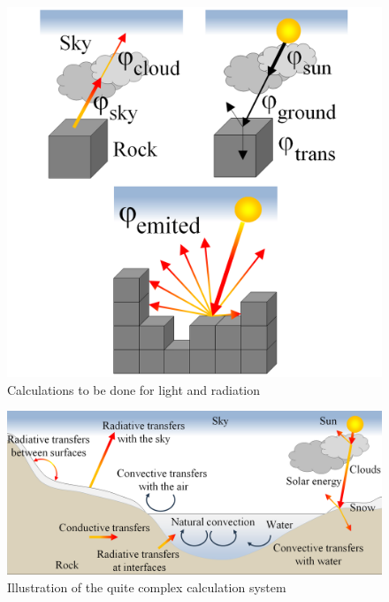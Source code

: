 \begin{figure}[htb]
	\centering
	\includegraphics[width=\linewidth]{BF01/sem_heat_merged2.png}
	\caption{Calculations to be done for light and radiation}
	\label{fig:calcradiation}
\end{figure}

\begin{figure}[htb]
	\centering
	\includegraphics[width=\linewidth]{BF01/8904_1.png}
	\caption{Illustration of the quite complex calculation system}
	\label{fig:calcsystem}
\end{figure}

